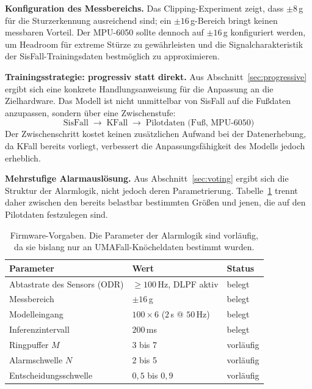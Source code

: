\documentclass[11pt,a4paper,oneside]{report}
\begin{document}
\textbf{Konfiguration des Messbereichs.} Das Clipping-Experiment
zeigt, dass $\pm 8$\,g für die Sturzerkennung ausreichend sind; ein
$\pm 16$\,g-Bereich bringt keinen messbaren Vorteil. Der MPU-6050
sollte dennoch auf $\pm 16$\,g konfiguriert werden, um
Headroom für extreme Stürze zu gewährleisten und die
Signalcharakteristik der SisFall-Trainingsdaten bestmöglich zu
approximieren.

\textbf{Trainingsstrategie: progressiv statt direkt.} Aus
Abschnitt~\ref{sec:progressive} ergibt sich eine konkrete
Handlungsanweisung für die Anpassung an die Zielhardware. Das Modell
ist nicht unmittelbar von SisFall auf die Fußdaten anzupassen,
sondern über eine Zwischenstufe:
\[
\text{SisFall} \;\longrightarrow\; \text{KFall} \;\longrightarrow\;
\text{Pilotdaten (Fuß, MPU-6050)}
\]
Der Zwischenschritt kostet keinen zusätzlichen Aufwand bei der
Datenerhebung, da KFall bereits vorliegt, verbessert die
Anpassungsfähigkeit des Modells jedoch erheblich.

\textbf{Mehrstufige Alarmauslösung.} Aus Abschnitt~\ref{sec:voting}
ergibt sich die Struktur der Alarmlogik, nicht jedoch deren
Parametrierung. Tabelle~\ref{tab:firmwarevorgabe} trennt daher
zwischen den bereits belastbar bestimmten Größen und jenen, die auf
den Pilotdaten festzulegen sind.

\begin{table}[H]
\centering
\caption{Firmware-Vorgaben. Die Parameter der Alarmlogik sind
         vorläufig, da sie bislang nur an UMAFall-Knöcheldaten
         bestimmt wurden.}
\label{tab:firmwarevorgabe}
\small
\begin{tabularx}{0.95\textwidth}{X l l}
\toprule
\textbf{Parameter} & \textbf{Wert} & \textbf{Status} \\
\midrule
Abtastrate des Sensors (ODR)  & $\geq 100$\,Hz, DLPF aktiv & belegt \\
Messbereich                   & $\pm 16$\,g & belegt \\
Modelleingang                 & $100 \times 6$ ($2$\,s @ $50$\,Hz) & belegt \\
Inferenzintervall             & $200$\,ms & belegt \\
\midrule
Ringpuffer $M$                & 3 bis 7 & vorläufig \\
Alarmschwelle $N$             & 2 bis 5 & vorläufig \\
Entscheidungsschwelle         & $0{,}5$ bis $0{,}9$ & vorläufig \\
\bottomrule
\end{tabularx}
\end{table}
\end{document}
